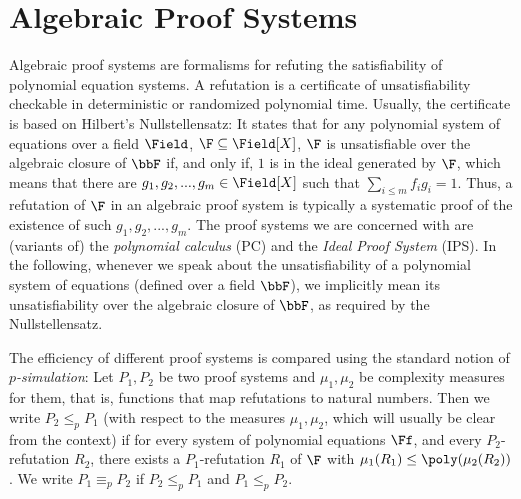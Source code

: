 \documentclass[a4paper,UKenglish,cleveref, autoref, thm-restate]{lipics-v2021}
\begin{document}
	\section{Algebraic Proof Systems}
	\label{sec:proofSystems}
	Algebraic proof systems are formalisms for refuting the satisfiability of polynomial equation systems. 
	A refutation is a certificate of unsatisfiability checkable in deterministic or randomized polynomial time. 
	Usually, the certificate is based on Hilbert's Nullstellensatz: It states that for any polynomial system of equations over a field $\Field$,
	$\F \subseteq \Field[X]$, $\F$ is unsatisfiable over the algebraic closure of $\bbF$ if, and only if,
	$1$ is in the ideal generated by $\F$, which means that there are
	$g_1,g_2,...,g_m \in \Field[X]$ such that $\sum_{i \leq m}f_ig_i = 1$. 
	Thus, a refutation of $\F$ in an algebraic proof system is typically a systematic proof of the existence of such $g_1,g_2,...,g_m$.
	The proof systems we are concerned with are (variants of) the \emph{polynomial calculus} (PC) and the \emph{Ideal Proof System} (IPS).
	In the following, whenever we speak about the unsatisfiability of a polynomial system of equations (defined over a field $\bbF$), we implicitly mean its unsatisfiability over the algebraic closure of $\bbF$, as required by the Nullstellensatz. 
	
	The efficiency of different proof systems is compared using the standard notion of \emph{$p$-simulation}:
	Let $P_1,P_2$ be two proof systems and $\mu_1, \mu_2$ be complexity measures for them, that is, functions that map refutations to natural numbers.
	Then we write $P_2 \leq_p P_1$ (with respect to the measures $\mu_1, \mu_2$, which will usually be clear from the context) if for every system of polynomial equations $\Ff$, and every $P_2$-refutation $R_2$, there exists a $P_1$-refutation $R_1$ of $\F$ with $\mu_1(R_1) \leq \poly(\mu_2(R_2))$.
	We write $P_1 \equiv_p P_2$ if $P_2 \leq_p P_1$ and $P_1 \leq_p P_2$.
		
\end{document}
